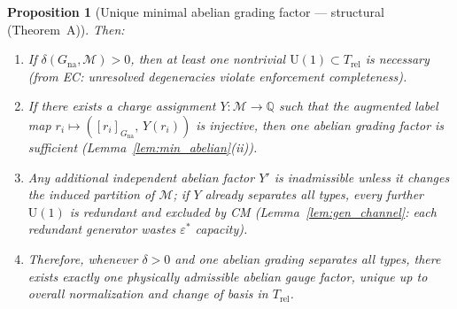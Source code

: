 \documentclass[11pt,a4paper]{article}
\newtheorem{proposition}[theorem]{Proposition}
\theoremstyle{definition}
\newcommand{\U}{\mathrm{U}}
\begin{document}
\begin{proposition}[Unique minimal abelian grading factor ---
structural (Theorem~A)]
Then:
\begin{enumerate}[label=(\roman*),nosep]
  \item If $\delta(G_{\mathrm{na}}, \mathcal{M}) > 0$, then at
  least one nontrivial $\U(1) \subset T_{\mathrm{rel}}$ is necessary
  (from EC: unresolved degeneracies violate enforcement completeness).
  \item If there exists a charge assignment $Y: \mathcal{M} \to \mathbb{Q}$
  such that the augmented label map
  $r_i \mapsto ([r_i]_{G_{\mathrm{na}}},\, Y(r_i))$
  is injective, then one abelian grading factor is sufficient
  (Lemma~\ref{lem:min_abelian}(ii)).
  \item Any additional independent abelian
  factor $Y'$ is inadmissible unless it changes the induced partition of
  $\mathcal{M}$; if $Y$ already separates all types, every further
  $\U(1)$ is redundant and excluded by CM
  (Lemma~\ref{lem:gen_channel}: each redundant generator wastes
  $\varepsilon^*$ capacity).
  \item Therefore, whenever $\delta > 0$ and one abelian grading
  separates all types, there exists exactly one physically admissible
  abelian gauge factor, unique up to overall normalization and change
  of basis in $T_{\mathrm{rel}}$.
\end{enumerate}
\end{proposition}
\end{document}
